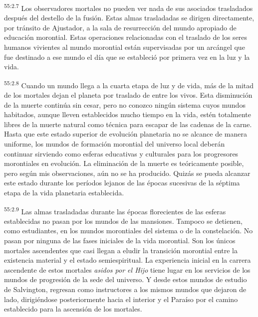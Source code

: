 \par
\textsuperscript{55:2.7} Los observadores mortales no pueden ver nada de sus asociados trasladados después del destello de la fusión. Estas almas trasladadas se dirigen directamente, por tránsito de Ajustador, a la sala de resurrección del mundo apropiado de educación morontial. Estas operaciones relacionadas con el traslado de los seres humanos vivientes al mundo morontial están supervisadas por un arcángel que fue destinado a ese mundo el día que se estableció por primera vez en la luz y la vida.

\par
\textsuperscript{55:2.8} Cuando un mundo llega a la cuarta etapa de luz y de vida, más de la mitad de los mortales dejan el planeta por traslado de entre los vivos. Esta disminución de la muerte continúa sin cesar, pero no conozco ningún sistema cuyos mundos habitados, aunque lleven establecidos mucho tiempo en la vida, estén totalmente libres de la muerte natural como técnica para escapar de las cadenas de la carne. Hasta que este estado superior de evolución planetaria no se alcance de manera uniforme, los mundos de formación morontial del universo local deberán continuar sirviendo como esferas educativas y culturales para los progresores morontiales en evolución. La eliminación de la muerte es teóricamente posible, pero según mis observaciones, aún no se ha producido. Quizás se pueda alcanzar este estado durante los períodos lejanos de las épocas sucesivas de la séptima etapa de la vida planetaria establecida.

\par
\textsuperscript{55:2.9} Las almas trasladadas durante las épocas florecientes de las esferas establecidas no pasan por los mundos de las mansiones. Tampoco se detienen, como estudiantes, en los mundos morontiales del sistema o de la constelación. No pasan por ninguna de las fases iniciales de la vida morontial. Son los únicos mortales ascendentes que casi llegan a eludir la transición morontial entre la existencia material y el estado semiespiritual. La experiencia inicial en la carrera ascendente de estos mortales \textit{asidos por el Hijo} tiene lugar en los servicios de los mundos de progresión de la sede del universo. Y desde estos mundos de estudio de Salvington, regresan como instructores a los mismos mundos que dejaron de lado, dirigiéndose posteriormente hacia el interior y el Paraíso por el camino establecido para la ascensión de los mortales.

